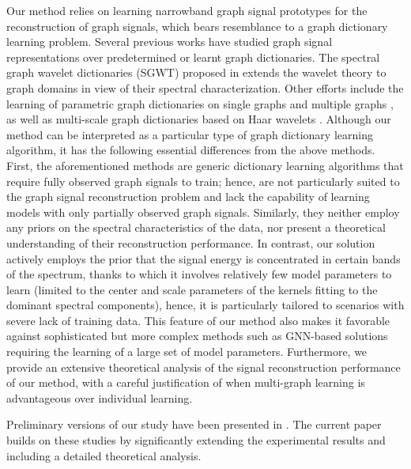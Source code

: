 Our method relies on learning narrowband graph signal prototypes for the reconstruction of graph signals, which bears resemblance to a graph dictionary learning problem. Several previous works have studied graph signal representations over predetermined or learnt graph dictionaries. The  spectral graph wavelet dictionaries (SGWT) proposed in \cite{hammond2011wavelets} extends the wavelet theory to graph domains in view of their spectral characterization. Other efforts include the learning of parametric graph dictionaries on single graphs \cite{thanou2014learning} and multiple graphs \cite{thanou2015multi}, as well as multi-scale graph dictionaries based on Haar wavelets \cite{8642839}. Although our method can be interpreted as a particular type of graph dictionary learning algorithm, it has the following essential differences from the above methods. First, the aforementioned methods are generic dictionary learning algorithms that require fully observed graph signals to train; hence, are not particularly suited to the graph signal reconstruction problem and lack the capability of learning models with only partially observed graph signals. Similarly, they neither  employ any priors on the spectral characteristics of the data, nor present a theoretical understanding of their reconstruction performance. In contrast, our solution actively employs the prior that the signal energy is concentrated in certain bands of the spectrum, thanks to which it involves relatively few model parameters to learn (limited to the center and scale parameters of the kernels fitting to the dominant spectral components), hence, it is particularly tailored to scenarios with severe lack of training data. This feature of our method also makes it favorable against sophisticated but more complex methods such as GNN-based solutions requiring the learning of a large set of model parameters.  Furthermore, we provide an extensive theoretical analysis of the signal reconstruction performance of our method, with a careful justification of when multi-graph learning is advantageous over individual learning.




Preliminary versions of our study have been presented in \cite{TurhanV21, KarTV22}. The current paper builds on these studies by significantly extending the experimental results and including a detailed theoretical analysis.